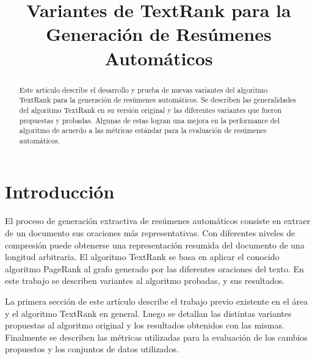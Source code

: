 \documentclass{llncs}
\begin{document}
\frontmatter

\title{Variantes de TextRank para la Generación de Resúmenes Automáticos}



\maketitle

\begin{abstract}
Este artículo describe el desarrollo y prueba de nuevas variantes del algoritmo
TextRank para la generación de resúmenes automáticos. Se describen las generalidades
del algoritmo TextRank en su versión original y las diferentes variantes
que fueron propuestas y probadas. Algunas de estas logran una mejora en
la performance del algoritmo de acuerdo a las métricas estándar para la evaluación de
resúmenes automáticos. 

\end{abstract}

\section{Introducción}
El proceso de generación extractiva de resúmenes automáticos consiste en extraer de un documento sus oraciones más representativas. Con diferentes niveles de compresión puede obtenerse una representación resumida del documento de una longitud arbitraria. El algoritmo TextRank se basa en aplicar el conocido algoritmo PageRank al grafo generado por las diferentes oraciones del texto. En este trabajo se describen variantes al algoritmo probadas, y sus resultados.

La primera sección de este artículo describe el trabajo previo existente en el área y el algoritmo TextRank en general. Luego se detallan las distintas variantes propuestas al algoritmo original y los resultados obtenidos con las mismas. Finalmente se describen las métricas utilizadas para la evaluación de los cambios propuestos y los conjuntos de datos utilizados.
\end{document}

